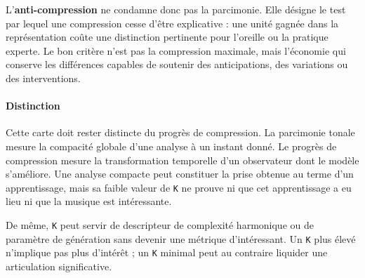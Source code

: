 \documentclass[10pt,a4paper]{article}
\begin{document}
L'\textbf{anti-compression} ne condamne donc pas la parcimonie. Elle désigne le test par lequel une compression cesse d'être explicative : une unité gagnée dans la représentation coûte une distinction pertinente pour l'oreille ou la pratique experte. Le bon critère n'est pas la compression maximale, mais l'économie qui conserve les différences capables de soutenir des anticipations, des variations ou des interventions.

\paragraph{Distinction}
Cette carte doit rester distincte du progrès de compression. La parcimonie tonale mesure la compacité globale d'une analyse à un instant donné. Le progrès de compression mesure la transformation temporelle d'un observateur dont le modèle s'améliore. Une analyse compacte peut constituer la prise obtenue au terme d'un apprentissage, mais sa faible valeur de \texttt{K} ne prouve ni que cet apprentissage a eu lieu ni que la musique est intéressante.

De même, \texttt{K} peut servir de descripteur de complexité harmonique ou de paramètre de génération sans devenir une métrique d'intéressant. Un \texttt{K} plus élevé n'implique pas plus d'intérêt ; un \texttt{K} minimal peut au contraire liquider une articulation significative.
\end{document}
